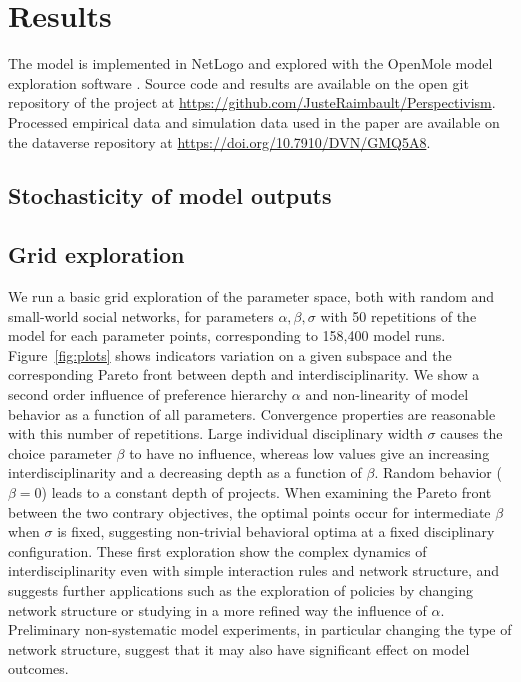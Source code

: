 \documentclass[utf8]{frontiersFPHY} %
\begin{document}
\section{Results}


The model is implemented in NetLogo \cite{tisue2004netlogo} and explored with the OpenMole model exploration software \cite{reuillon2013openmole}. Source code and results are available on the open git repository of the project at \url{https://github.com/JusteRaimbault/Perspectivism}. Processed empirical data and simulation data used in the paper are available on the dataverse repository at \url{https://doi.org/10.7910/DVN/GMQ5A8}.


\subsection{Stochasticity of model outputs}



\subsection{Grid exploration}

We run a basic grid exploration of the parameter space, both with random and small-world social networks, for parameters $\alpha,\beta,\sigma$ with 50 repetitions of the model for each parameter points, corresponding to 158,400 model runs. Figure~\ref{fig:plots} shows indicators variation on a given subspace and the corresponding Pareto front between depth and interdisciplinarity. We show a second order influence of preference hierarchy $\alpha$ and non-linearity of model behavior as a function of all parameters. Convergence properties are reasonable with this number of repetitions. Large individual disciplinary width $\sigma$ causes the choice parameter $\beta$ to have no influence, whereas low values give an increasing interdisciplinarity and a decreasing depth as a function of $\beta$. Random behavior ($\beta = 0$) leads to a constant depth of projects. When examining the Pareto front between the two contrary objectives, the optimal points occur for intermediate $\beta$ when $\sigma$ is fixed, suggesting non-trivial behavioral optima at a fixed disciplinary configuration. These first exploration show the complex dynamics of interdisciplinarity even with simple interaction rules and network structure, and suggests further applications such as the exploration of policies by changing network structure or studying in a more refined way the influence of $\alpha$. Preliminary non-systematic model experiments, in particular changing the type of network structure, suggest that it may also have significant effect on model outcomes.
\end{document}
